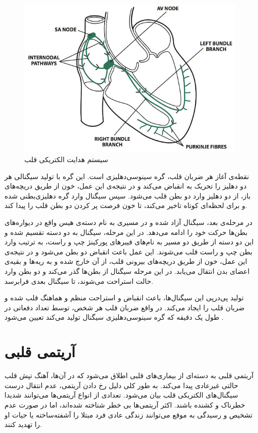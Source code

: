 \begin{figure}
\centering
\includegraphics[width=12cm]{Figures/conduction.jpg}
\caption{سیستم هدایت الکتریکی قلب\cite{Medicalexamprep}}
\label{fig:conduction}
\end{figure}

نقطه‌ی آغاز هر ضربان قلب، گره سینوسی‌دهلیزی است. این گره با تولید سیگنالی هر دو دهلیز را تحریک به انقباض می‌کند و در نتیجه‌ی این عمل، خون از طریق دریچه‌های باز، از دو دهلیز وارد دو بطن قلب می‌شود. سپس سیگنال وارد گره دهلیزی‌بطنی شده و برای لحظه‌ای کوتاه تاخیر می‌کند، تا خون فرصت پر کردن دو بطن قلب را پیدا کند. 

در مرحله‌ی بعد، سیگنال آزاد شده و در مسیری به نام دسته‌ی هیس واقع در دیواره‌های بطن‌ها حرکت خود را ادامه می‌دهد. در این مرحله، سیگنال به دو دسته تقسیم شده و این دو دسته از طریق دو مسیر به نام‌های فیبرهای پورکینژ چپ و راست، به ترتیب وارد بطن چپ و راست قلب می‌شوند. این عمل باعث انقباض دو بطن می‌شود و در نتیجه‌ی این عمل، خون از طریق دریچه‌های بیرونی قلب، از آن خارج شده و به ریه‌ها و بقیه‌ی اعضای بدن انتقال می‌یابد. در این مرحله سیگنال از بطن‌ها گذر می‌کند و دو بطن وارد حالت استراحت می‌شوند، تا سیگنال بعدی فرابرسد.

تولید پی‌در‌پی این سیگنال‌ها، باعث انقباض و استراحت منظم و هماهنگ قلب شده و ضربان قلب را ایجاد می‌کند. در واقع ضربان قلب هر شخص، توسط تعداد دفعاتی در طول یک دقیقه که گره سینوسی‌دهلیزی سیگنال تولید می‌کند تعیین می‌شود \cite{Heart}. 


\section{آریتمی قلبی}
آریتمی قلبی به دسته‌ای از بیماری‌های قلبی اطلاق می‌شود که در آن‌ها، آهنگ تپش قلب حالتی غیرعادی پیدا می‌کند. به طور کلی دلیل رخ دادن آریتمی، عدم انتقال درست سیگنال‌های الکتریکی قلب بیان می‌شود. تعدادی از انواع آریتمی‌ها می‌توانند شدیدا خطرناک و کشنده باشند. اکثر آریتمی‌ها بی خطر شناخته شده‌اند، اما در صورت عدم تشخیص و رسیدگی به موقع می‌توانند زندگی عادی فرد مبتلا را آشفته‌ساخته یا حیات او را تهدید کنند. 
